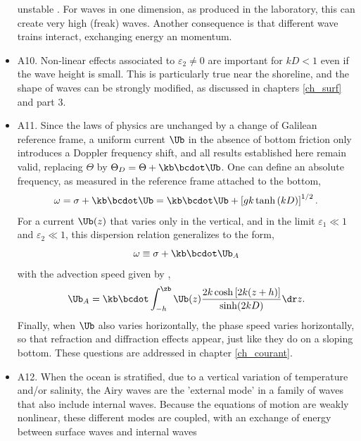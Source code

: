 \begin{itemize}
unstable \citep{Benjamin&Feir1967}. For waves in one dimension, as produced in the laboratory, 
this can create very high (freak) waves. Another consequence is that different wave trains interact, 
exchanging energy an momentum.\vspace{0.3cm}
 \item A10. Non-linear effects associated to  $\varepsilon_2 \neq 0$ are important for $kD<1$ even if the wave height is small. 
This is particularly true near the shoreline, and the shape of waves can be strongly modified, as discussed in chapters \ref{ch_surf} and 
part 3.\vspace{0.3cm}
 \item A11. Since the laws of physics are unchanged by a change of Galilean reference frame, 
a uniform current $\Ub$ in the absence of bottom friction only introduces a Doppler frequency shift, 
and all results established here remain valid, replacing 
$\Theta$ by $\Theta_D=\Theta+\kb \bcdot
 \Ub$. One can define an absolute frequency, as measured in the reference frame attached to the bottom, 
 \begin{equation}
    \omega=\sigma+\kb \bcdot \Ub =\kb \bcdot \Ub + \left[g k \tanh\left(kD\right)\right]^{1/2}.
     \label{dispersionD}
\end{equation}
For a current   $\Ub(z)$ that varies only in the vertical, and in the limit  $\varepsilon_1 \ll 1$  and $\varepsilon_2 \ll 1$, 
this dispersion relation generalizes to the form,
 \begin{equation}
    \omega\equiv\sigma+\kb \bcdot \Ub_A      \label{dispersionD2}
\end{equation}
with the advection speed given by \cite{Kirby&Chen1989}, 
 \begin{equation}
 \Ub_A   = \kb \bcdot \int_{-h}^{\zb} \Ub(z) \frac{2  k
\cosh\left[2k(z+h)\right]}{\sinh(2kD)} \dr z. \label{dispersionD3}
\end{equation}
Finally, when $\Ub$ also varies horizontally, the phase speed varies horizontally, so that refraction and diffraction effects 
appear, just like they do on a sloping bottom. These questions are addressed  in  chapter \ref{ch_courant}.\vspace{0.3cm}
\item A12. When the ocean is stratified, due to a vertical variation of temperature and/or salinity, the Airy waves are the 'external mode' in a family of waves that also include internal waves. 
Because the equations of motion are weakly nonlinear, these different modes are coupled, with an exchange of energy between surface waves and internal waves 

\end{itemize}
